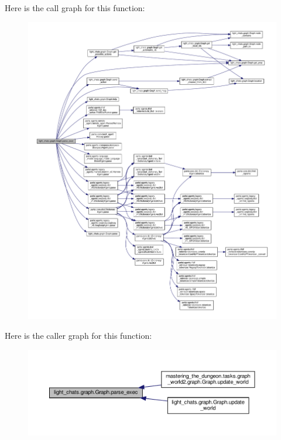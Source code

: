 Here is the call graph for this function\+:
\nopagebreak
\begin{figure}[H]
\begin{center}
\leavevmode
\includegraphics[width=350pt]{classlight__chats_1_1graph_1_1Graph_a9aede2dd27f6a9ab66f38eaa5f649195_cgraph}
\end{center}
\end{figure}
Here is the caller graph for this function\+:
\nopagebreak
\begin{figure}[H]
\begin{center}
\leavevmode
\includegraphics[width=350pt]{classlight__chats_1_1graph_1_1Graph_a9aede2dd27f6a9ab66f38eaa5f649195_icgraph}
\end{center}
\end{figure}
\mbox{\label{classlight__chats_1_1graph_1_1Graph_a6eaae6c0b9fbcaf9f478a790ff356671}} 
